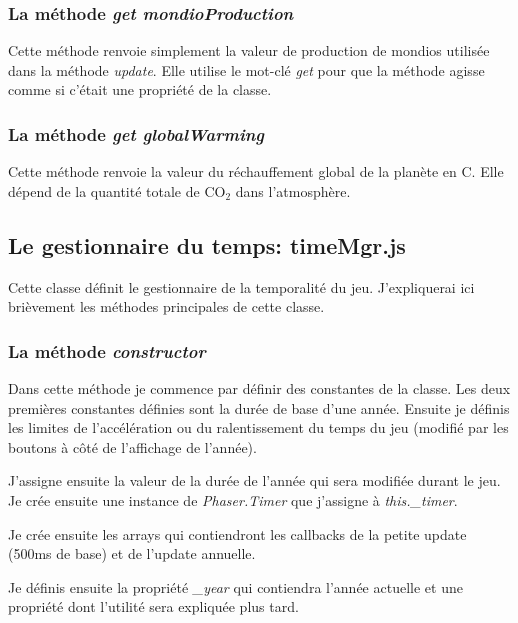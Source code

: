 \documentclass{article}
\begin{document}
		\subsubsection{La méthode \textit{get mondioProduction}} \label{mondioProduction}
		Cette méthode renvoie simplement la valeur de production de mondios utilisée dans la méthode \textit{update}. Elle utilise le mot-clé \textit{get} pour que la méthode agisse comme si c'était une propriété de la classe.
		
		\subsubsection{La méthode \textit{get globalWarming}} \label{globalWarming}
		Cette méthode renvoie la valeur du réchauffement global de la planète en \degree C. Elle dépend de la quantité totale de CO$_{2}$ dans l'atmosphère.
		
		\subsection{Le gestionnaire du temps: timeMgr.js} \label{timeMgr}
		
		
		Cette classe définit le gestionnaire de la temporalité du jeu. J'expliquerai ici brièvement les méthodes principales de cette classe.
		
		\subsubsection{La méthode \textit{constructor}}
		Dans cette méthode je commence par définir des constantes de la classe. Les deux premières constantes définies sont la durée de base d'une année. Ensuite je définis les limites de l'accélération ou du ralentissement du temps du jeu (modifié par les boutons à côté de l'affichage de l'année).
		
		
		J'assigne ensuite la valeur de la durée de l'année qui sera modifiée durant le jeu. Je crée ensuite une instance de \textit{Phaser.Timer} que j'assigne à \textit{this.\_timer}.
		
		Je crée ensuite les arrays qui contiendront les callbacks de la petite update (500ms de base) et de l'update annuelle. 
		
		
		Je définis ensuite la propriété \textit{\_year} qui contiendra l'année actuelle et une propriété dont l'utilité sera expliquée plus tard.
		
\end{document}
